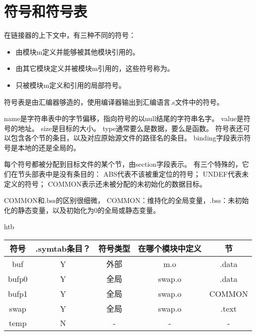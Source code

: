 
\section{符号和符号表}
{
    在链接器的上下文中，有三种不同的符号：

    \begin{itemize}
        \item 由模块m定义并能够被其他模块引用的。
        \item 由其它模块定义并被模块m引用的，这些符号称为。
        \item 只被模块m定义和引用的局部符号。
    \end{itemize}

    符号表是由汇编器够造的，使用编译器输出到汇编语言.s文件中的符号。

    name是字符串表中的字节偏移，指向符号的以null结尾的字符串名字。
    value是符号的地址。
    size是目标的大小。
    type通常要么是数据，要么是函数。
    符号表还可以包含各个节的条目，以及对应原始源文件的路径名的条目。
    binding字段表示符号是本地的还是全局的。

    每个符号都被分配到目标文件的某个节，由section字段表示。
    有三个特殊的，它们在节头部表中是没有条目的：
    ABS代表不该被重定位的符号；
    UNDEF代表未定义的符号；
    COMMON表示还未被分配的未初始化的数据目标。

    COMMON和.bss的区别很细微，
    COMMON：维持化的全局变量，.bss：未初始化的静态变量，以及初始化为0的全局或静态变量。

    \begin{practicec}
        \begin{table}{htb}
            \centering

            \begin{tabular}{|c|c|c|c|c|}
                \hline
                符号 & .symtab条目？ & 符号类型 & 在哪个模块中定义 & 节 \\
                \hline
                buf & Y & 外部 & m.o & .data \\
                \hline
                bufp0 & Y & 全局 & swap.o & .data \\
                \hline
                bufp1 & Y & 全局 & swap.o & COMMON \\
                \hline
                swap & Y & 全局 & swap.o & .text \\
                \hline
                temp & N & - & - & - \\
                \hline
            \end{tabular}
        \end{table}
    \end{practicec}
}
